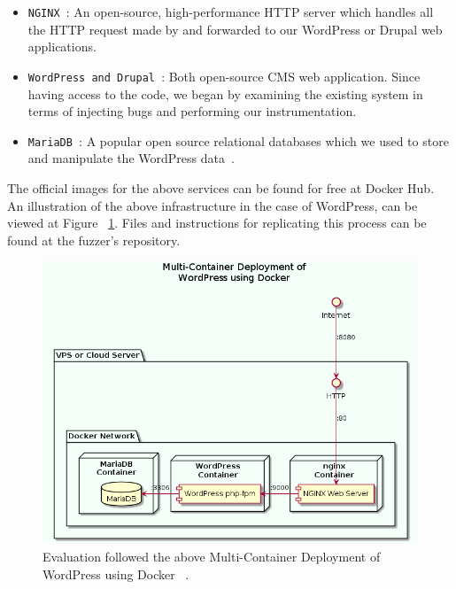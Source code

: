 \begin{itemize}
	\item {\tt NGINX }: An open-source, high-performance HTTP server which handles all the HTTP request made by \pname{} and forwarded to our WordPress or Drupal web applications.{~\cite{nginx}}
	\item {\tt WordPress and Drupal }: Both open-source CMS web application. Since having access to the code, we began by examining the existing system in terms of injecting bugs and performing our instrumentation.
	\item {\tt MariaDB }: A popular open source relational databases which we used to store and manipulate the WordPress data~\cite{mariadb}.
\end{itemize}

The official images for the above services can be found for free at Docker Hub. An illustration of the above infrastructure in the case of WordPress, can be viewed at Figure ~\ref{fig:multi-container}. Files and instructions for replicating this process can be found at the fuzzer's repository.

\begin{figure}[ht]
 \centering
 \captionsetup{justification=centering}
 \includegraphics[width=\linewidth]{figures/multi-container.png}
 \caption{Evaluation followed the above Multi-Container Deployment of WordPress using Docker ~\cite{multi-container}.}
 \label{fig:multi-container}
\end{figure}

